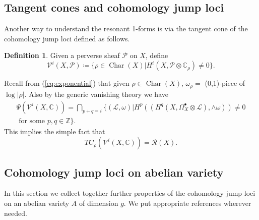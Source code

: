 \documentclass[11pt,reqno]{amsart}
\theoremstyle{definition}
\newtheorem{definition}[theorem]{Definition}
\theoremstyle{remark}
\theoremstyle{cited}
\theoremstyle{citeddef}
\DeclareMathOperator{\Char}{Char}
\def\Pic{{\rm Pic}}
\newcommand{\sL}{\mathcal{L}}
\newcommand{\sM}{\mathcal{M}}
\newcommand{\sP}{\mathcal{P}}
\newcommand{\sR}{\mathcal{R}}
\newcommand\sV{{\mathcal V}}
\newcommand{\bbC}{\mathbb{C}}
\newcommand{\bbZ}{\mathbb{Z}}
\begin{document}
\subsection{Tangent cones and cohomology jump loci}
\label{sub:tc} Another way to understand the resonant 1-forms is via the tangent cone of the cohomology jump loci defined
as follows.
\begin{definition}
Given a perverse sheaf $\sP$ on $X$, define
\[\sV^i(X,\sP) \coloneqq \{\rho\in\Char(X)|
H^i(X,\sP\otimes \bbC_{\rho})\neq 0\}.\]
\end{definition}
Recall from (\ref{eq:exponential}) that given $\rho\in \Char(X)$, $\omega_{\rho} = $ (0,1)-piece of $\log|\rho|$. 
Also by the generic vanishing theory \cite[Theorem 3]{Ara} we have 
\begin{equation}\begin{split}
\Psi(\sV^i(X,\bbC))
=\bigcap_{p+q = i}\{(\sL,\omega)| H^p((H^q(X,\Omega_X^{\bullet}\otimes \sL),\wedge\omega)) \neq 0
\\ \text{ for some } p,q\in\bbZ\}.
\end{split}\label{eq:}
\end{equation}
This implies the simple fact that
\[TC_{\rho}(\sV^i(X,\bbC)) = \sR(X).\]

\subsection{Cohomology jump loci on abelian variety}
In this section we collect together further properties of the
cohomology jump loci on an abelian variety $A$ of dimension $g$.
We put appropriate references wherever needed.
\end{document}
